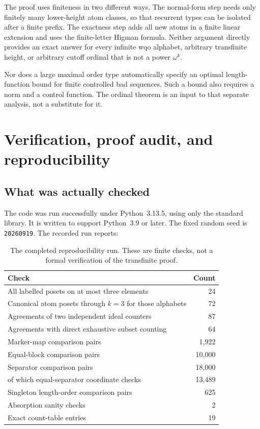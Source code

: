 \documentclass[11pt,letterpaper]{article}
\theoremstyle{definition}
\theoremstyle{remark}
\begin{document}
The proof uses finiteness in two different ways. The normal-form step
needs only finitely many lower-height atom classes, so that recurrent
types can be isolated after a finite prefix. The exactness step adds all
new atoms in a finite linear extension and uses the finite-letter Higman
formula. Neither argument directly provides an exact answer for every
infinite wqo alphabet, arbitrary transfinite height, or arbitrary cutoff
ordinal that is not a power $\omega^k$.

Nor does a large maximal order type automatically specify an optimal
length-function bound for finite controlled bad sequences. Such a bound
also requires a norm and a control function. The ordinal theorem is an
input to that separate analysis, not a substitute for it.

\section{Verification, proof audit, and reproducibility}\label{sec:audit}

\subsection{What was actually checked}

The code was run successfully under Python~3.13.5, using only the standard
library. It is written to support Python~3.9 or later. The fixed random
seed is \texttt{20260919}. The recorded run reports:

\begin{table}[ht]
\centering
\renewcommand{\arraystretch}{1.13}
\begin{tabular}{@{}lr@{}}
\toprule
Check & Count\\
\midrule
All labelled posets on at most three elements & 24\\
Canonical atom posets through $k=3$ for those alphabets & 72\\
Agreements of two independent ideal counters & 87\\
Agreements with direct exhaustive subset counting & 64\\
Marker-map comparison pairs & 1,922\\
Equal-block comparison pairs & 10,000\\
Separator comparison pairs & 18,000\\
\quad of which equal-separator coordinate checks & 13,489\\
Singleton length-order comparison pairs & 625\\
Absorption sanity checks & 2\\
Exact count-table entries & 19\\
\bottomrule
\end{tabular}
\caption{The completed reproducibility run. These are finite checks, not
a formal verification of the transfinite proof.}
\label{tab:verification}
\end{table}
\end{document}
